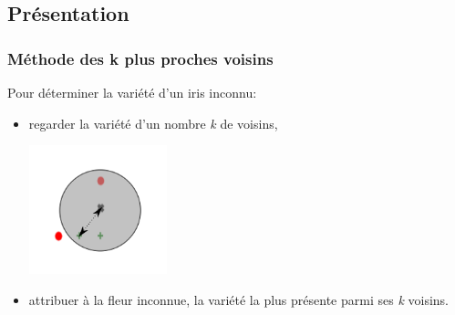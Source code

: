 \documentclass[svgnames,11pt]{beamer}
\begin{document}
\subsection{Présentation}
\begin{frame}
    \frametitle{Méthode des \textbf{k plus proches voisins}}

    Pour déterminer la variété d'un iris inconnu:
    \begin{itemize}
        \item<1-> regarder la variété d'un nombre \emph{k} de voisins,
        \begin{center}
            \includegraphics[width=4cm]{ressources/zoom-k3-slides.png}
        \end{center}
        \item <2-> attribuer à la fleur inconnue, la variété la plus présente parmi ses \emph{k} voisins.
    \end{itemize}

\end{frame}
\end{document}
